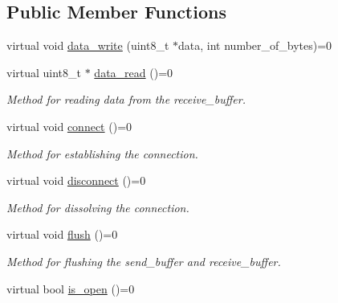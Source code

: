 \subsection*{Public Member Functions}
\begin{DoxyCompactItemize}
\item 
virtual void \hyperlink{class_transport_protocol_af3f6c35f652d73ea3170c64d2b96ff53}{data\+\_\+write} (uint8\+\_\+t $\ast$data, int number\+\_\+of\+\_\+bytes)=0
\item 
\hypertarget{class_transport_protocol_a0145d85c5758e08c94cf60d708eaba08}{}virtual uint8\+\_\+t $\ast$ \hyperlink{class_transport_protocol_a0145d85c5758e08c94cf60d708eaba08}{data\+\_\+read} ()=0\label{class_transport_protocol_a0145d85c5758e08c94cf60d708eaba08}

\begin{DoxyCompactList}\small\item\em Method for reading data from the receive\+\_\+buffer. \end{DoxyCompactList}\item 
\hypertarget{class_transport_protocol_ad0ba1d2982dfaa4b51493548efbf09c6}{}virtual void \hyperlink{class_transport_protocol_ad0ba1d2982dfaa4b51493548efbf09c6}{connect} ()=0\label{class_transport_protocol_ad0ba1d2982dfaa4b51493548efbf09c6}

\begin{DoxyCompactList}\small\item\em Method for establishing the connection. \end{DoxyCompactList}\item 
\hypertarget{class_transport_protocol_a6bc407636830e8e5ff10377b965181eb}{}virtual void \hyperlink{class_transport_protocol_a6bc407636830e8e5ff10377b965181eb}{disconnect} ()=0\label{class_transport_protocol_a6bc407636830e8e5ff10377b965181eb}

\begin{DoxyCompactList}\small\item\em Method for dissolving the connection. \end{DoxyCompactList}\item 
\hypertarget{class_transport_protocol_a1a375d6ab518309c432e56e59043ff4a}{}virtual void \hyperlink{class_transport_protocol_a1a375d6ab518309c432e56e59043ff4a}{flush} ()=0\label{class_transport_protocol_a1a375d6ab518309c432e56e59043ff4a}

\begin{DoxyCompactList}\small\item\em Method for flushing the send\+\_\+buffer and receive\+\_\+buffer. \end{DoxyCompactList}\item 
\hypertarget{class_transport_protocol_aee4e0241f2dbb3cd89712a1e01fe38d4}{}virtual bool \hyperlink{class_transport_protocol_aee4e0241f2dbb3cd89712a1e01fe38d4}{is\+\_\+open} ()=0\label{class_transport_protocol_aee4e0241f2dbb3cd89712a1e01fe38d4}


\end{DoxyCompactItemize}
